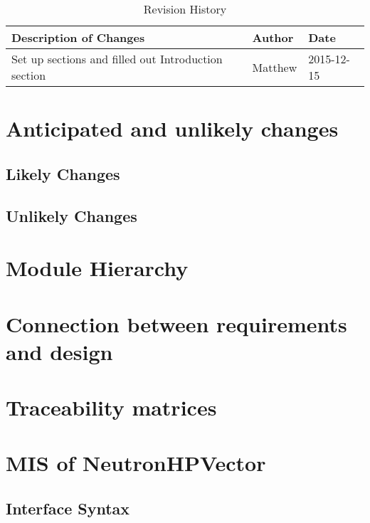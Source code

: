 \documentclass[12pt]{article}
\begin{document}
\begin{table}[h]
\centering
\caption{Revision History}\label{Table_Revision}
\begin{tabular}{lll}

\toprule
\bf Description of Changes & \bf Author & \bf Date\\\midrule
Set up sections and filled out Introduction section & Matthew & 2015-12-15\\
\bottomrule
\end{tabular}
\end{table}

\section{Anticipated and unlikely changes}
\subsection{Likely Changes} %

\subsection{Unlikely Changes} %

\section{Module Hierarchy}%

\section{Connection between requirements and design}%

\section{Traceability matrices}%




\section{MIS of NeutronHPVector}

\subsection{Interface Syntax}%
\end{document}
